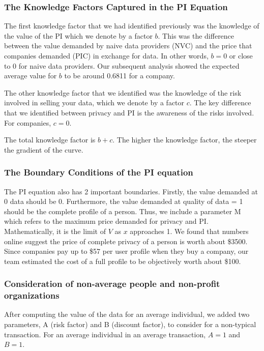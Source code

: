 \documentclass{icmmcm}
\begin{document}
\subsubsection{The Knowledge Factors Captured in the PI Equation}
The first knowledge factor that we had identified previously was the knowledge of the value of the PI which we denote by a factor $b$. This was the difference between the value demanded by naive data providers (NVC) and the price that companies demanded (PIC) in exchange for data. In other words, $b=0$ or close to $0$ for naive data providers. Our subsequent analysis showed the expected average value for $b$ to be around 0.6811 for a company.

The other knowledge factor that we identified was the knowledge of the risk involved in selling your data, which we denote by a factor $c$. The key difference that we identified between privacy and PI is the awareness of the risks involved. For companies, $c=0$.

The total knowledge factor is $b+c$. The higher the knowledge factor, the steeper the gradient of the curve. %

\subsubsection{The Boundary Conditions of the PI equation}
The PI equation also has 2 important boundaries. Firstly, the value demanded at 0 data should be 0.
Furthermore, the value demanded at quality of data = 1 should be the complete profile of a person. Thus, we include a parameter M which refers to the maximum price demanded for privacy and PI. Mathematically, it is the limit of $V$ as $x$ approaches 1. 
We found that numbers online suggest the price of complete privacy of a person is worth about \$3500. Since companies pay up to \$57 per user profile when they buy a company, our team estimated the cost of a full profile to be objectively worth about \$100. \citep{data_tgd}

\subsubsection{Consideration of non-average people and non-profit organizations}
After computing the value of the data for an average individual, we added two parameters, A (risk factor) and B (discount factor), to consider for a non-typical transaction. For an average individual in an average transaction, $A=1$ and $B=1$.
\end{document}
